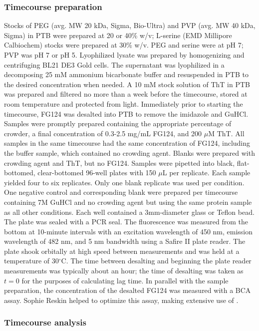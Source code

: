 \subsubsection{Timecourse preparation} Stocks of PEG (avg. MW 20 kDa, Sigma, Bio-Ultra) and PVP (avg. MW 40 kDa, Sigma) in PTB were prepared at 20 or 40\% w/v; L-serine (EMD Millipore Calbiochem) stocks were prepared at 30\% w/v.  PEG and serine were at pH 7; PVP was pH 7 or pH 5.  Lyophilized lysate was prepared by homogenizing and centrifuging BL21 DE3 Gold cells.  The supernatant was lyophilized in a decomposing 25 mM ammonium bicarbonate buffer and resuspended in PTB to the desired concentration when needed.  A 10 mM stock solution of ThT in PTB was prepared and filtered no more than a week before the timecourse, stored at room temperature and protected from light.  Immediately prior to starting the timecourse, FG124 was desalted into PTB to remove the imidazole and GuHCl.  Samples were promptly prepared containing the appropriate percentage of crowder, a final concentration of 0.3-2.5 mg/mL FG124, and 200 $\mu$M ThT.  All samples in the same timecourse had the same concentration of FG124, including the buffer sample, which contained no crowding agent.  Blanks were prepared with crowding agent and ThT, but no FG124.  Samples were pipetted into black, flat-bottomed, clear-bottomed 96-well plates with 150 $\mu$L per replicate.  Each sample yielded four to six replicates.  Only one blank replicate was used per condition.  One negative control and corresponding blank were prepared per timecourse containing 7M GuHCl and no crowding agent but using the same protein sample as all other conditions.  Each well contained a 3mm-diameter glass or Teflon bead.  The plate was sealed with a PCR seal.  The fluorescence was measured from the bottom at 10-minute intervals with an excitation wavelength of 450 nm, emission wavelength of 482 nm, and 5 nm bandwidth using a Safire II plate reader.  The plate shook orbitally at high speed between measurements and was held at a temperature of 30$^\circ$C.  The time between desalting and beginning the plate reader measurements was typically about an hour; the time of desalting was taken as $t=0$ for the purposes of calculating lag time. In parallel with the sample preparation, the concentration of the desalted FG124 was measured with a BCA assay.  Sophie Reskin helped to optimize this assay, making extensive use of \cite{giehm10}.

\subsubsection{Timecourse analysis}

